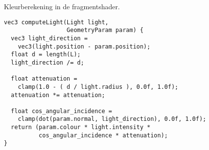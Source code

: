 \begin{listing}[b]
  \centering %
%
  \caption{Kleurberekening in de fragmentshader.}
  \begin{verbatim}
vec3 computeLight(Light light,
                  GeometryParam param) {
  vec3 light_direction = 
    vec3(light.position - param.position);
  float d = length(L);
  light_direction /= d;

  float attenuation = 
    clamp(1.0 - ( d / light.radius ), 0.0f, 1.0f);
  attenuation *= attenuation;

  float cos_angular_incidence = 
    clamp(dot(param.normal, light_direction), 0.0f, 1.0f);
  return (param.colour * light.intensity * 
          cos_angular_incidence * attenuation);
}
  \end{verbatim}
  \label{lst:io-computeLight}
\end{listing}

